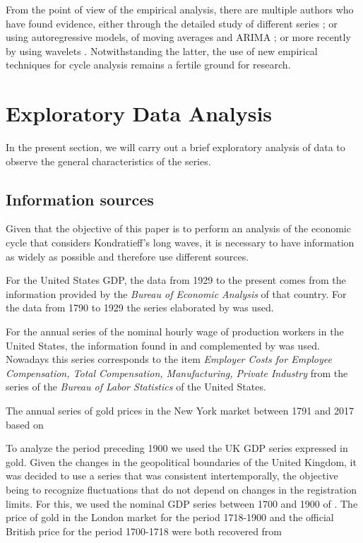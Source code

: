 \documentclass[a4paper]{article}
\begin{document}
	From the point of view of the empirical analysis, there are multiple authors who have found evidence, either through the detailed study of different series \citep{kuznets1930secular, kondratieff1979long, schumpeter1939business}; or using autoregressive models, of moving averages and ARIMA \citep {hamilton1989new, kaiser2012measuring}; or more recently by using wavelets \citep {yogo2008measuring, soares2011business}. Notwithstanding the latter, the use of new empirical techniques for cycle analysis remains a fertile ground for research.
	
	\section{Exploratory Data Analysis}\label{EDA}
	
	In the present section, we will carry out a brief exploratory analysis of data to observe the general characteristics of the series.
	
	\subsection{Information sources}
	
	Given that the objective of this paper is to perform an analysis of the economic cycle that considers Kondratieff's long waves, it is necessary to have information as widely as possible and therefore use different sources.
	
	For the United States GDP, the data from 1929 to the present comes from the information provided by the \textit{Bureau of Economic Analysis} of that country. For the data from 1790 to 1929 the series elaborated by \cite{johnston2018us} was used.
	
	For the annual series of the nominal hourly wage of production workers in the United States, the information found in \cite{officer2009two} and complemented by \cite{Roesch2018} was used. Nowadays this series corresponds to the item \textit{Employer Costs for Employee Compensation, Total Compensation, Manufacturing, Private Industry} from the series of the \textit{Bureau of Labor Statistics} of the United States.
	
	The annual series of gold prices in the New York market between 1791 and 2017 based on \cite{officer2018gold}
	
	To analyze the period preceding 1900 we used the UK GDP series expressed in gold. Given the changes in the geopolitical boundaries of the United Kingdom, it was decided to use a series that was consistent intertemporally, the objective being to recognize fluctuations that do not depend on changes in the registration limits. For this, we used the nominal GDP series between 1700 and 1900 of \cite{Williamson2018uk}. The price of gold in the London market for the period 1718-1900 and the official British price for the period 1700-1718 were both recovered from \cite{officer2018gold}
	
\end{document}

